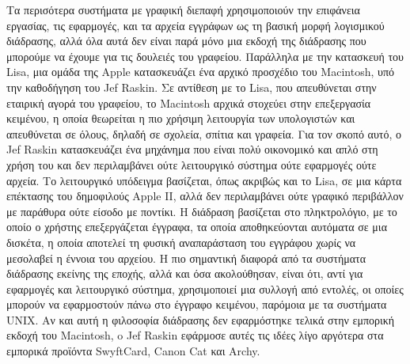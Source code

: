 \documentclass[
]{article}
\begin{document}
Τα περισότερα συστήματα με γραφική διεπαφή χρησιμοποιούν την επιφάνεια
εργασίας, τις εφαρμογές, και τα αρχεία εγγράφων ως τη βασική μορφή
λογισμικού διάδρασης, αλλά όλα αυτά δεν είναι παρά μόνο μια εκδοχή της
διάδρασης που μπορούμε να έχουμε για τις δουλειές του γραφείου.
Παράλληλα με την κατασκευή του Lisa, μια ομάδα της Apple κατασκευάζει
ένα αρχικό προσχέδιο του Macintosh, υπό την καθοδήγηση του Jef Raskin.
Σε αντίθεση με το Lisa, που απευθύνεται στην εταιρική αγορά του
γραφείου, το Macintosh αρχικά στοχεύει στην επεξεργασία κειμένου, η
οποία θεωρείται η πιο χρήσιμη λειτουργία των υπολογιστών και απευθύνεται
σε όλους, δηλαδή σε σχολεία, σπίτια και γραφεία. Για τον σκοπό αυτό, ο
Jef Raskin κατασκευάζει ένα μηχάνημα που είναι πολύ οικονομικό και απλό
στη χρήση του και δεν περιλαμβάνει ούτε λειτουργικό σύστημα ούτε
εφαρμογές ούτε αρχεία. Το λειτουργικό υπόδειγμα βασίζεται, όπως ακριβώς
και το Lisa, σε μια κάρτα επέκτασης του δημοφιλούς Apple II, αλλά δεν
περιλαμβάνει ούτε γραφικό περιβάλλον με παράθυρα ούτε είσοδο με ποντίκι.
Η διάδραση βασίζεται στο πληκτρολόγιο, με το οποίο ο χρήστης
επεξεργάζεται έγγραφα, τα οποία αποθηκεύονται αυτόματα σε μια δισκέτα, η
οποία αποτελεί τη φυσική αναπαράσταση του εγγράφου χωρίς να μεσολαβεί η
έννοια του αρχείου. Η πιο σημαντική διαφορά από τα συστήματα διάδρασης
εκείνης της εποχής, αλλά και όσα ακολούθησαν, είναι ότι, αντί για
εφαρμογές και λειτουργικό σύστημα, χρησιμοποιεί μια συλλογή από εντολές,
οι οποίες μπορούν να εφαρμοστούν πάνω στο έγγραφο κειμένου, παρόμοια με
τα συστήματα UNIX. Αν και αυτή η φιλοσοφία διάδρασης δεν εφαρμόστηκε
τελικά στην εμπορική εκδοχή του Macintosh, o Jef Raskin εφάρμοσε αυτές
τις ιδέες λίγο αργότερα στα εμπορικά προϊόντα SwyftCard, Canon Cat και
Archy.
\end{document}
